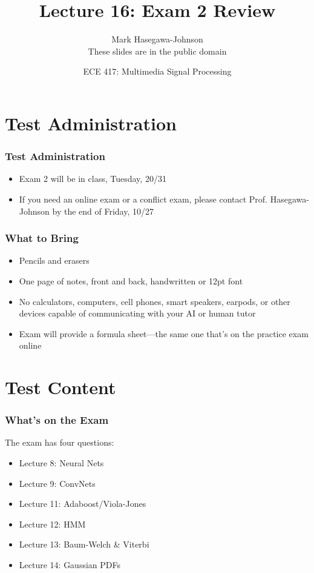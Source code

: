 \documentclass{beamer}
\title{Lecture 16: Exam 2 Review}
\author{Mark Hasegawa-Johnson\\These slides are in the public domain}
\date{ECE 417: Multimedia Signal Processing}
\begin{document}
\begin{frame}
  \maketitle
\end{frame}

\begin{frame}
  \tableofcontents
\end{frame}

\section[Admin]{Test Administration}
\setcounter{subsection}{1}

\begin{frame}
  \frametitle{Test Administration}

  \begin{itemize}
  \item Exam 2 will be in class, Tuesday, 20/31
  \item If you need an online exam or a conflict exam, please contact
    Prof. Hasegawa-Johnson by the end of Friday, 10/27
  \end{itemize}
\end{frame}
  
\begin{frame}
  \frametitle{What to Bring}

  \begin{itemize}
  \item Pencils and erasers
  \item One page of notes, front and back, handwritten or 12pt font
  \item No calculators, computers, cell phones, smart speakers,
    earpods, or other devices capable of communicating with your AI
    or human tutor
  \item Exam will provide a formula sheet---the same one that's on the
    practice exam online
  \end{itemize}
\end{frame}
  
\section[Content]{Test Content}
\setcounter{subsection}{1}

\begin{frame}
  \frametitle{What's on the Exam}

  The exam has four questions:
  \begin{itemize}
  \item Lecture 8: Neural Nets
  \item Lecture 9: ConvNets
  \item Lecture 11: Adaboost/Viola-Jones
  \item Lecture 12: HMM
  \item Lecture 13: Baum-Welch \& Viterbi
  \item Lecture 14: Gaussian PDFs
  \end{itemize}
\end{frame}
\end{document}
